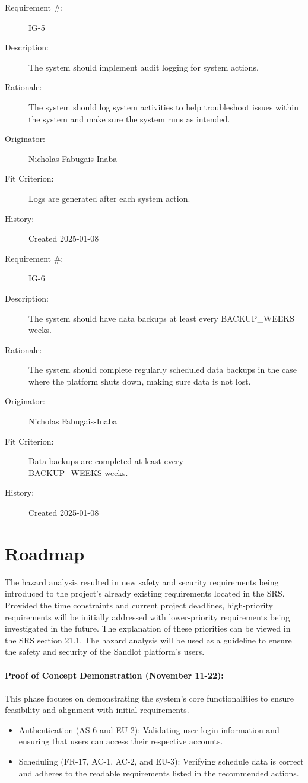 \documentclass{article}
\newenvironment{myreq}[1]{%
\setlist[description]{font=\normalfont\color{darkgray}}%
\begin{tcolorbox}[colframe=black,colback=white, sharp corners, boxrule=1pt]%
\bfseries\color{blue}%
\begin{description}#1}%
{\end{description}\end{tcolorbox}}
\newcommand{\twoinline}[2]{\begin{multicols}{2}#1 #2\end{multicols}}
\newcommand{\reqno}{\item[Requirement \#:]}
\newcommand{\reqdesc}{\item[Description:]}
\newcommand{\reqrat}{\item[Rationale:]}
\newcommand{\reqorig}{\item[Originator:]}
\newcommand{\reqfit}{\item[Fit Criterion:]}
\newcommand{\reqsatis}{\item[Customer Satisfaction:]}
\newcommand{\reqdissat}{\item[Customer Dissatisfaction:]}
\newcommand{\reqhist}{\item[History:]}
\begin{document}
\begin{myreq}
  \reqno IG-5
  \reqdesc The system should implement audit logging for system actions.
  \reqrat The system should log system activities to help troubleshoot issues
  within the system and make sure the system runs as intended.
  \reqorig Nicholas Fabugais-Inaba
  \reqfit Logs are generated after each system action.
  \twoinline
    {\reqsatis 3}
    {\reqdissat 3}
  \reqhist Created 2025-01-08
\end{myreq}

\begin{myreq}
  \reqno IG-6
  \reqdesc The system should have data backups at least every BACKUP\_WEEKS weeks.
  \reqrat The system should complete regularly scheduled data backups in the case
  where the platform shuts down, making sure data is not lost.
  \reqorig Nicholas Fabugais-Inaba
  \reqfit Data backups are completed at least every
  \\ BACKUP\_WEEKS weeks.
  \twoinline
    {\reqsatis 3}
    {\reqdissat 3}
  \reqhist Created 2025-01-08
\end{myreq}

\section{Roadmap}

The hazard analysis resulted in new safety and security requirements being
introduced to the project's already existing requirements located in the
SRS. Provided the time constraints and current project deadlines, high-priority
requirements will be initially addressed with lower-priority requirements
being investigated in the future. The explanation of these priorities can be viewed
in the SRS section 21.1. The hazard analysis will be used as a guideline
to ensure the safety and security of the Sandlot platform's users.\\\\

\textbf{Proof of Concept Demonstration (November 11-22):} \\\\
This phase focuses on demonstrating the system's core functionalities to ensure
feasibility and alignment with initial requirements. 
\begin{itemize}
  \item Authentication (AS-6 and EU-2): Validating user login information and ensuring
  that users can access their respective accounts.
  \item Scheduling (FR-17, AC-1, AC-2, and EU-3):  Verifying schedule data is correct
  and adheres to the readable requirements listed in the recommended actions.\\
\end{itemize}
\end{document}
